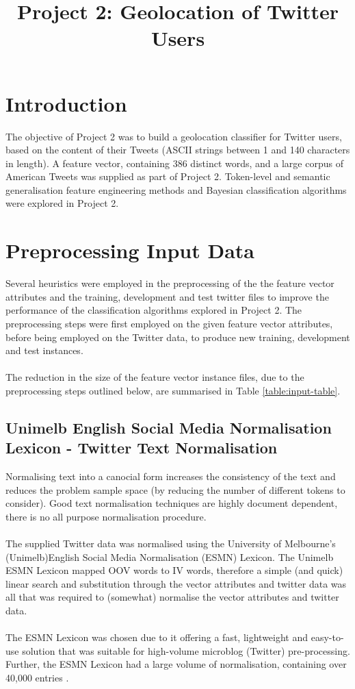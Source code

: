 \documentclass[11pt]{article}
\begin{document}
\title{Project 2: Geolocation of Twitter Users}
\maketitle

\section{Introduction}
The objective of Project 2 was to build a geolocation classifier for Twitter users, based on the content of their Tweets (ASCII strings between 1 and 140 characters in length). A feature vector, containing 386 distinct words, and a large corpus of American Tweets was supplied as part of Project 2. Token-level and semantic generalisation feature engineering methods and Bayesian classification algorithms were explored in Project 2.

\section{Preprocessing Input Data}  

Several heuristics were employed in the preprocessing of the the feature vector attributes and the training, development and test twitter files to improve the performance of the classification algorithms explored in Project 2. The preprocessing steps were first employed on the given feature vector attributes, before being employed on the Twitter data, to produce new training, development and test instances.\\\\
The reduction in the size of the feature vector instance files, due to the preprocessing steps outlined below, are summarised in Table \ref{table:input-table}.

\subsection{Unimelb English Social Media Normalisation Lexicon - Twitter Text Normalisation}
Normalising text into a canocial form increases the consistency of the text and reduces the problem sample space (by reducing the number of different tokens to consider). Good text normalisation techniques are highly document dependent, there is no all purpose normalisation procedure.\\\\
The supplied Twitter data was normalised using the University of Melbourne's (Unimelb)English Social Media Normalisation (ESMN) Lexicon. The Unimelb ESMN Lexicon mapped OOV words to IV words, therefore a simple (and quick) linear search and substitution through the vector attributes and twitter data was all that was required to (somewhat) normalise the vector attributes and twitter data.\\\\
The ESMN Lexicon was chosen due to it offering a fast, lightweight and easy-to-use solution that was suitable for high-volume microblog (Twitter) pre-processing. Further, the ESMN Lexicon had a large volume of normalisation, containing over 40,000 entries \citep{bald-ESMNL}. 
\end{document}
